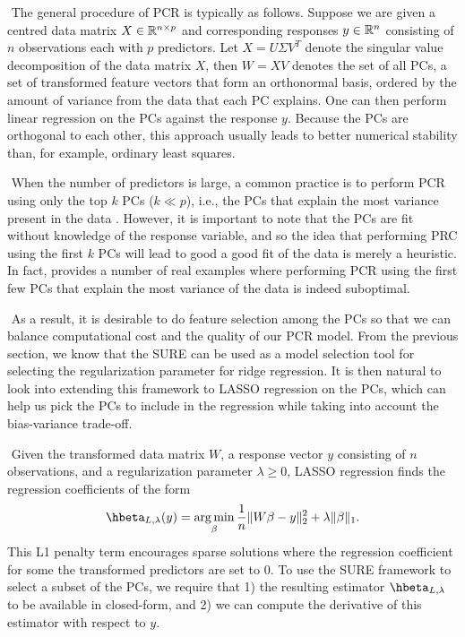 $ $\newline
The general procedure of PCR is typically as follows. Suppose we are given a centred data matrix $X \in \mathbb{R}^{n\times p}$ and corresponding responses $y\in\mathbb{R}^n$ consisting of $n$ observations each with $p$ predictors. Let $X = U\Sigma V^T$ denote the singular value decomposition of the data matrix $X$, then $W = XV$ denotes the set of all PCs, a set of transformed feature vectors that form an orthonormal basis, ordered by the amount of variance from the data that each PC explains. One can then perform linear regression on the PCs against the response $y$. Because the PCs are orthogonal to each other, this approach usually leads to better numerical stability than, for example, ordinary least squares. 

$ $\newline
When the number of predictors is large, a common practice is to perform PCR using only the top $k$ PCs ($k\ll p$), i.e., the PCs that explain the most variance present in the data \citep{cera2019genes,harel2019predicting}. However, it is important to note that the PCs are fit without knowledge of the response variable, and so the idea that performing PRC using the first $k$ PCs will lead to good a good fit of the data is merely a heuristic. In fact, \citet{jolliffe1982note} provides a number of real examples where performing PCR using the first few PCs that explain the most variance of the data is indeed suboptimal.

$ $\newline
As a result, it is desirable to do feature selection among the PCs so that we can balance computational cost and the quality of our PCR model. From the previous section, we know that the SURE can be used as a model selection tool for selecting the regularization parameter for ridge regression. It is then natural to look into extending this framework to LASSO regression on the PCs, which can help us pick the PCs to include in the regression while taking into account the bias-variance trade-off.

$ $\newline
Given the transformed data matrix $W$, a response vector $y$ consisting of $n$ observations, and a regularization parameter $\lambda\geq0$, LASSO regression finds the regression coefficients of the form
\[
\hbeta_{L,\lambda}(y) = \argmin_{\beta} \frac{1}{n}\|W\beta - y\|_2^2 + \lambda\|\beta\|_1.
\]
This L1 penalty term encourages sparse solutions where the regression coefficient for some the transformed predictors are set to $0$. To use the SURE framework to select a subset of the PCs, we require that 1) the resulting estimator $\hbeta_{L,\lambda}$ to be available in closed-form, and 2) we can compute the derivative of this estimator with respect to $y$.

